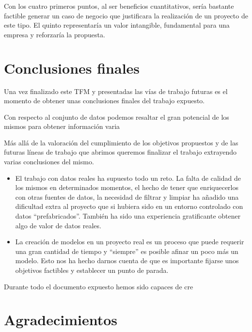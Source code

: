 Con los cuatro primeros puntos, al ser beneficios cuantitativos, sería bastante factible generar un caso de negocio que justificara la realización de un proyecto de este tipo. El quinto representaría un valor intangible, fundamental para una empresa y reforzaría la propuesta.



\section{Conclusiones finales}

Una vez finalizado este TFM y presentadas las vías de trabajo futuras es el momento de obtener unas conclusiones finales del trabajo expuesto. 

Con respecto al conjunto de datos podemos resaltar el gran potencial de los mismos para obtener información varia 




Más allá de la valoración del cumplimiento de los objetivos propuestos y de las futuras líneas de trabajo que abrimos queremos finalizar el trabajo extrayendo varias conclusiones del mismo. 


\begin{itemize}
\item El trabajo con datos reales ha supuesto todo un reto. La falta de calidad de los mismos en determinados momentos, el hecho de tener que enriquecerlos con otras fuentes de datos, la necesidad de filtrar y limpiar ha añadido una dificultad extra al proyecto que si hubiera sido en un entorno controlado con datos ``prefabricados''. También ha sido una experiencia gratificante obtener algo de valor de datos reales. 

\item La creación de modelos en un proyecto real es un proceso que puede requerir una gran cantidad de tiempo y ``siempre'' es posible afinar un poco más un modelo. Esto nos ha hecho darnos cuenta de que es importante fijarse unos objetivos factibles y establecer un punto de parada.
\end{itemize}

Durante todo el documento expuesto hemos sido capaces de cre




\section{Agradecimientos}



